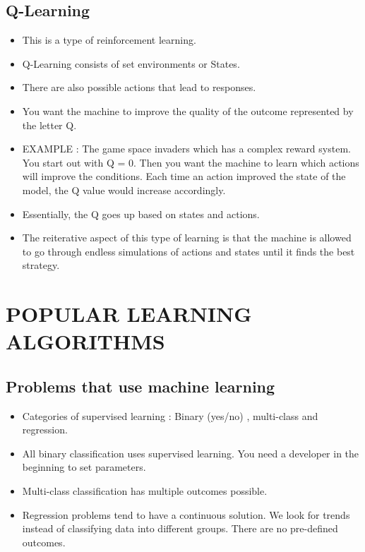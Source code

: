 \documentclass[11pt, oneside]{article}   	%
\begin{document}
\subsection{Q-Learning}
\begin{itemize}
\item This is a type of reinforcement learning.
\item Q-Learning consists of set environments or States.
\item There are also possible actions that lead to responses.
\item You want the machine to improve the quality of the outcome represented by the letter Q.
\item EXAMPLE : The game space invaders which has a complex reward system. \\
You start out with Q = 0. Then you want the machine to learn which actions will improve the conditions. Each time an action improved the state of the model, the Q value would increase accordingly.
\item Essentially, the Q goes up based on states and actions.
\item The reiterative aspect of this type of learning is that the machine is allowed to go through endless simulations of actions and states until it finds the best strategy.
\end{itemize}
\section{POPULAR LEARNING ALGORITHMS}
\subsection{Problems that use machine learning}
\begin{itemize}
\item Categories of supervised learning : Binary (yes/no) , multi-class and regression.
\item All binary classification uses supervised learning. You need a developer in the beginning to set parameters.
\item Multi-class classification has multiple outcomes possible.
\item Regression problems tend to have a continuous solution. We look for trends instead of classifying data into different groups. There are no pre-defined outcomes. 
\end{itemize}
\end{document}
